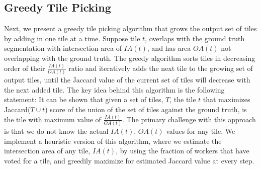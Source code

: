 \subsection{Greedy Tile Picking}
Next, we present a greedy tile picking algorithm that grows the output set of tiles by adding in one tile at a time. Suppose tile $t$, overlaps with the ground truth segmentation with intersection area of $IA(t)$, and has area $OA(t)$ not overlapping with the ground truth. The greedy algorithm sorts tiles in decreasing order of their $\frac{IA(t)}{OA(t)}$ ratio and iteratively adds the next tile to the growing set of output tiles, until the Jaccard value of the current set of tiles will decrease with the next added tile.  The key idea behind this algorithm is the following statement: It can be shown that given a set of tiles, $T$, the tile $t$ that maximizes Jaccard($T\cup t$) score of the union of the set of tiles against the ground truth, is the tile with maximum value of $\frac{IA(t)}{OA(t)}$. The primary challenge with this approach is that we do not know the actual $IA(t)$, $OA(t)$ values for any tile. We implement a heuristic version of this algorithm, where we estimate the intersection area of any tile, $IA(t)$, by using the fraction of workers that have voted for a tile, and greedily maximize for estimated Jaccard value at every step. 

